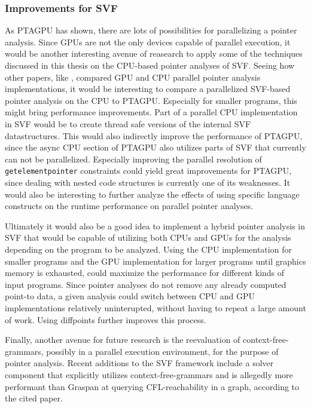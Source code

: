 \subsubsection{Improvements for SVF}
As PTAGPU has shown, there are lots of possibilities for parallelizing a pointer analysis.
Since GPUs are not the only devices capable of parallel execution, it would be another interesting avenue of reasearch to apply some of the techniques discussed in this thesis on the CPU-based pointer analyses of SVF.
Seeing how other papers, like \cite{mendez2012gpu}, compared GPU and CPU parallel pointer analysis implementations, it would be interesting to compare a parallelized SVF-based pointer analysis on the CPU to PTAGPU. Especially for smaller programs, this might bring performance improvements.
Part of a parallel CPU implementation in SVF would be to create thread safe versions of the internal SVF datastructures.
This would also indirectly improve the performance of PTAGPU, since the async CPU section of PTAGPU also utilizes parts of SVF that currently can not be parallelized.
Especially improving the parallel resolution of \verb|getelementpointer| constraints could yield great improvements for PTAGPU, since dealing with nested code structures is currently one of its weaknesses.
It would also be interesting to further analyze the effects of using specific language constructs on the runtime performance on parallel pointer analyses.

Ultimately it would also be a good idea to implement a hybrid pointer analysis in SVF that would be capable of utilizing both CPUs and GPUs for the analysis depending on the program to be analyzed.
Using the CPU implementation for smaller programs and the GPU implementation for larger programs until graphics memory is exhausted, could maximize the performance for different kinds of input programs.
Since pointer analyses do not remove any already computed point-to data, a given analysis could switch between CPU and GPU implementations relatively uninterupted, without having to repeat a large amount of work.
Using diffpoints further improves this process.

Finally, another avenue for future research is the reevaluation of context-free-grammars, possibly in a parallel execution environment, for the purpose of pointer analysis.
Recent additions to the SVF framework include a solver component that explicitly utilizes context-free-grammars \cite{lei2022taming} and is allegedly more performant than Graspan at querying CFL-reachability in a graph, according to the cited paper.
